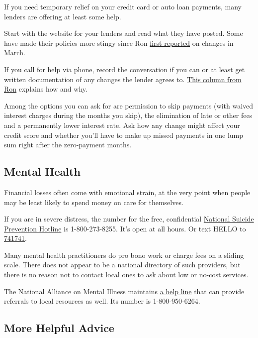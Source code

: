If you need temporary relief on your credit card or auto loan payments,
many lenders are offering at least some help.

Start with the website for your lenders and read what they have posted.
Some have made their policies more stingy since Ron
\href{https://www.nytimes.com/2020/03/17/your-money/loan-waivers-coronavirus.html}{first
reported} on changes in March.

If you call for help via phone, record the conversation if you can or at
least get written documentation of any changes the lender agrees to.
\href{https://www.nytimes.com/2020/05/16/business/coronavirus-financial-help.html}{This
column from Ron} explains how and why.

Among the options you can ask for are permission to skip payments (with
waived interest charges during the months you skip), the elimination of
late or other fees and a permanently lower interest rate. Ask how any
change might affect your credit score and whether you'll have to make up
missed payments in one lump sum right after the zero-payment months.

\hypertarget{mental-health}{%
\subsection{Mental Health}\label{mental-health}}

Financial losses often come with emotional strain, at the very point
when people may be least likely to spend money on care for themselves.

If you are in severe distress, the number for the free, confidential
\href{https://suicidepreventionlifeline.org/our-crisis-centers/}{National
Suicide Prevention Hotline} is 1-800-273-8255. It's open at all hours.
Or text HELLO to \href{https://www.crisistextline.org/text-us/}{741741}.

Many mental health practitioners do pro bono work or charge fees on a
sliding scale. There does not appear to be a national directory of such
providers, but there is no reason not to contact local ones to ask about
low or no-cost services.

The National Alliance on Mental Illness maintains
\href{https://nami.org/Support-Education/NAMI-HelpLine/NAMI-HelpLine-FAQs}{a
help line} that can provide referrals to local resources as well. Its
number is 1-800-950-6264.

\hypertarget{more-helpful-advice}{%
\subsection{More Helpful Advice}\label{more-helpful-advice}}

